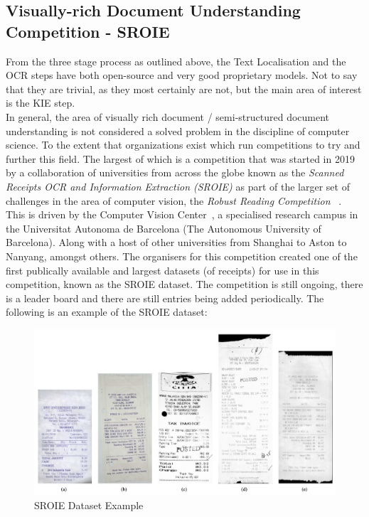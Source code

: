 \subsection{Visually-rich Document Understanding Competition - SROIE}
From the three stage process as outlined above, the Text Localisation and the OCR steps have both open-source and very good proprietary models.
Not to say that they are trivial, as they most certainly are not, but the main area of interest is the KIE step.\\
In general, the area of visually rich document / semi-structured document understanding is not considered a solved problem in the discipline of
computer science. To the extent that organizations exist which run competitions to try and further this field. The largest of which
is a competition that was started in 2019 by a collaboration of universities from across the globe known as the \emph{Scanned Receipts OCR
	and Information Extraction (SROIE)} as part of the larger set of challenges in the area of computer vision, the \emph{Robust Reading Competition}
~\autocite{OverviewICDAR2019}. This is driven by the Computer Vision Center~\autocite{ComputerVisionCenter}, a specialised research campus
in the Universitat Autonoma de Barcelona (The Autonomous University of Barcelona). Along with a host of other universities from Shanghai to
Aston to Nanyang, amongst others.
\bigbreak
The organisers for this competition created one of the first publically available and largest datasets
(of receipts) for use in this competition, known as the SROIE dataset. The competition is still ongoing, there is a leader board and there are still entries being added periodically.
The following is an example of the SROIE dataset:
\begin{figure}[H]
	\centering
	\includegraphics[width=1\textwidth]{figures/sroie_example.png}
	\caption{SROIE Dataset Example}
	\label{fig:sroie_dataset_example}
\end{figure}
